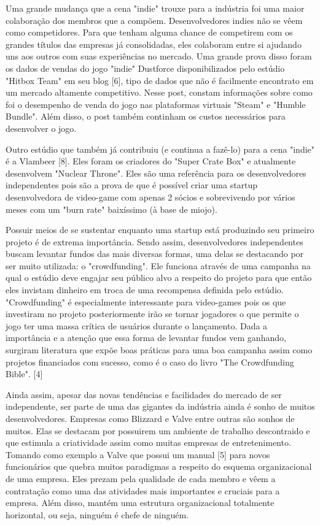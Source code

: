 Uma grande mudança que a cena "indie" trouxe para a indústria foi uma maior colaboração dos membros que a compõem. Desenvolvedores indies não se vêem como competidores. Para que tenham alguma chance de competirem com os grandes títulos das empresas já consolidadas, eles colaboram entre si ajudando uns aos outros com suas experiências no mercado. Uma grande prova disso foram os dados de vendas do jogo "indie" Dustforce disponibilizados pelo estúdio "Hitbox Team" em seu blog [6], tipo de dados que não é facilmente encontrato em um mercado altamente competitivo. Nesse post, constam informações sobre como foi o desempenho de venda do jogo nas plataformas virtuais "Steam" e "Humble Bundle". Além disso, o post também continham os custos necessários para desenvolver o jogo.

Outro estúdio que também já contribuiu (e continua a fazê-lo) para a cena "indie" é a Vlambeer [8]. Eles foram os criadores do "Super Crate Box" e atualmente desenvolvem "Nuclear Throne". Eles são uma referência para os desenvolvedores independentes pois são a prova de que é possível criar uma startup desenvolvedora de video-game com apenas 2 sócios e sobrevivendo por vários meses com um "burn rate" baixíssimo (à base de miojo).

Possuir meios de se sustentar enquanto uma startup está produzindo seu primeiro projeto é de extrema importância. Sendo assim, desenvolvedores independentes buscam levantar fundos das mais diversas formas, uma delas se destacando por ser muito utilizada: o "crowdfunding". Ele funciona através de uma campanha na qual o estúdio deve engajar seu público alvo a respeito do projeto para que então eles invistam dinheiro em troca de uma recompensa definida pelo estúdio. "Crowdfunding" é especialmente interessante para video-games pois os que investiram no projeto posteriormente irão se tornar jogadores o que permite o jogo ter uma massa crítica de usuários durante o lançamento. Dada a importância e a atenção que essa forma de levantar fundos vem ganhando, surgiram literatura que expõe boas práticas para uma boa campanha assim como projetos financiados com sucesso, como é o caso do livro "The Crowdfunding Bible". [4]

Ainda assim, apesar das novas tendências e facilidades do mercado de ser independente, ser parte de uma das gigantes da indústria ainda é sonho de muitos desenvolvedores. Empresas como Blizzard e Valve entre outras são sonhos de muitos. Elas se destacam por possuirem um ambiente de trabalho descontraido e que estimula a criatividade assim como muitas empresas de entretenimento. Tomando como exemplo a Valve que possui um manual [5] para novos funcionários que quebra muitos paradigmas a respeito do esquema organizacional de uma empresa. Eles prezam pela qualidade de cada membro e vêem a contratação como uma das atividades mais importantes e cruciais para a empresa. Além disso, mantém uma estrutura organizacional totalmente horizontal, ou seja, ninguém é chefe de ninguém.

